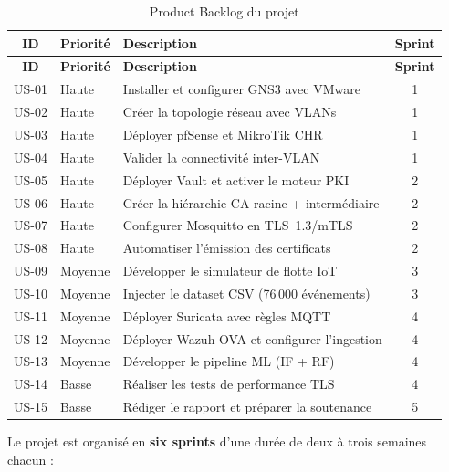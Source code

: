 \begin{longtable}{clp{7.2cm}c}
\caption{Product Backlog du projet}\label{tab:product_backlog}\\
\toprule
\textbf{ID} & \textbf{Priorité} & \textbf{Description} & \textbf{Sprint} \\
\midrule
\endfirsthead
\toprule
\textbf{ID} & \textbf{Priorité} & \textbf{Description} & \textbf{Sprint} \\
\midrule
\endhead
US-01 & Haute & Installer et configurer GNS3 avec VMware & 1 \\
US-02 & Haute & Créer la topologie réseau avec VLANs & 1 \\
US-03 & Haute & Déployer pfSense et MikroTik CHR & 1 \\
US-04 & Haute & Valider la connectivité inter-VLAN & 1 \\
US-05 & Haute & Déployer Vault et activer le moteur PKI & 2 \\
US-06 & Haute & Créer la hiérarchie CA racine + intermédiaire & 2 \\
US-07 & Haute & Configurer Mosquitto en TLS~1.3/mTLS & 2 \\
US-08 & Haute & Automatiser l'émission des certificats & 2 \\
US-09 & Moyenne & Développer le simulateur de flotte IoT & 3 \\
US-10 & Moyenne & Injecter le dataset CSV (76\,000 événements) & 3 \\
US-11 & Moyenne & Déployer Suricata avec règles MQTT & 4 \\
US-12 & Moyenne & Déployer Wazuh OVA et configurer l'ingestion & 4 \\
US-13 & Moyenne & Développer le pipeline ML (IF + RF) & 4 \\
US-14 & Basse & Réaliser les tests de performance TLS & 4 \\
US-15 & Basse & Rédiger le rapport et préparer la soutenance & 5 \\
\bottomrule
\end{longtable}

Le projet est organisé en \textbf{six sprints} d'une durée de deux à trois semaines chacun :

